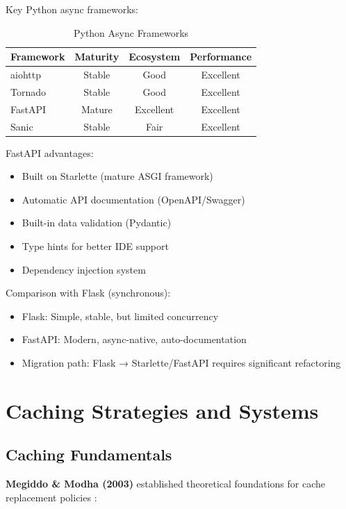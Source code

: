\documentclass[conference]{IEEEtran}
\begin{document}
Key Python async frameworks:

\begin{table}[h]
\centering
\caption{Python Async Frameworks}
\begin{tabular}{|l|c|c|c|}
\hline
\textbf{Framework} & \textbf{Maturity} & \textbf{Ecosystem} & \textbf{Performance} \\
\hline
aiohttp & Stable & Good & Excellent \\
Tornado & Stable & Good & Excellent \\
FastAPI & Mature & Excellent & Excellent \\
Sanic & Stable & Fair & Excellent \\
\hline
\end{tabular}
\end{table}

FastAPI advantages:
\begin{itemize}
    \item Built on Starlette (mature ASGI framework)
    \item Automatic API documentation (OpenAPI/Swagger)
    \item Built-in data validation (Pydantic)
    \item Type hints for better IDE support
    \item Dependency injection system
\end{itemize}

Comparison with Flask (synchronous):
\begin{itemize}
    \item Flask: Simple, stable, but limited concurrency
    \item FastAPI: Modern, async-native, auto-documentation
    \item Migration path: Flask → Starlette/FastAPI requires significant refactoring
\end{itemize}

\section{Caching Strategies and Systems}

\subsection{Caching Fundamentals}

\textbf{Megiddo \& Modha (2003)} established theoretical foundations for cache replacement policies \cite{megiddo2003arc}:
\end{document}
